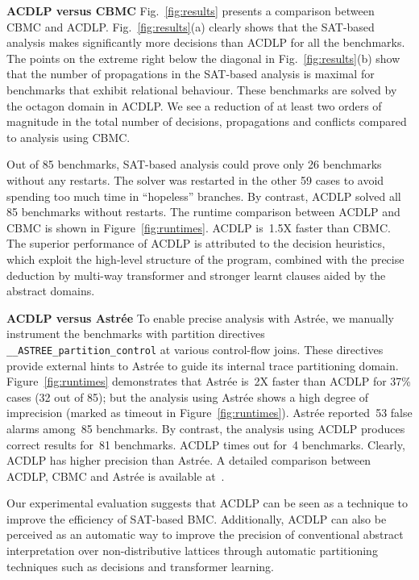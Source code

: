 

%

\medskip

\noindent \textbf{ACDLP versus CBMC}
Fig.~\ref{fig:results} presents a comparison between CBMC
and ACDLP.  Fig.~\ref{fig:results}(a) clearly shows that the SAT-based analysis 
makes significantly more decisions than ACDLP for all the benchmarks. 
The points on the extreme right below the diagonal in
Fig.~\ref{fig:results}(b) show that the number of propagations in the SAT-based 
analysis is maximal for benchmarks that exhibit relational behaviour.  These
benchmarks are solved by the octagon domain in ACDLP.  We see a reduction of at 
least two orders of magnitude in the total number of decisions, propagations 
and conflicts compared to analysis using CBMC.  

Out of 85 benchmarks, SAT-based analysis could prove only 26
benchmarks without any restarts.  The solver was restarted in the other 59 
cases to avoid spending too much time in ``hopeless'' branches.  By contrast, 
ACDLP solved all 85 benchmarks without restarts.  
The runtime comparison between ACDLP and CBMC is shown in 
Figure~\ref{fig:runtimes}.  ACDLP is~1.5X faster than CBMC. 
The superior performance of ACDLP is attributed to the decision heuristics, 
which exploit the high-level structure of the program, combined with the 
precise deduction by multi-way transformer and stronger learnt clauses aided 
by the abstract domains. 
%

\medskip

\noindent \textbf{ACDLP versus Astr{\'e}e}
%
To enable precise analysis with Astr{\'e}e, we manually instrument the
benchmarks with partition directives \texttt{\_\_ASTREE\_partition\_control}
at various control-flow joins.  These directives provide external hints to
Astr{\'e}e to guide its internal trace partitioning domain. 
Figure~\ref{fig:runtimes} demonstrates that Astr{\'e}e is~2X faster than
ACDLP for {37}\% cases (32 out of 85); but the analysis using Astr{\'e}e
shows a high degree of imprecision (marked as timeout in
Figure~\ref{fig:runtimes}).  Astr{\'e}e reported~53 false alarms among~85
benchmarks.  By contrast, the analysis using ACDLP produces correct results
for~81 benchmarks.  ACDLP times out for~4 benchmarks.  Clearly, ACDLP has
higher precision than Astr{\'e}e.  A detailed comparison between ACDLP, 
CBMC and Astr{\'e}e is available at~\cite{extended}.
%


Our experimental evaluation suggests that ACDLP can be seen as a
technique to improve the efficiency of SAT-based BMC.  Additionally, ACDLP can
also be perceived as an automatic way to improve the precision of conventional
abstract interpretation over non-distributive lattices through automatic
partitioning techniques such as decisions and transformer learning.
